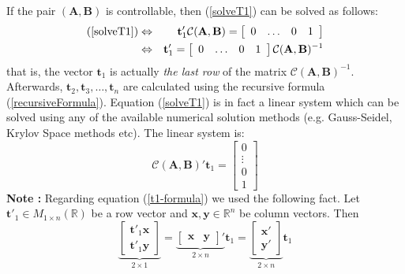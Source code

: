 \documentclass[a4paper,10pt,oneside]{book}
\begin{document}
%
%
%
\noindent If the pair $(\mathbf{A},\mathbf{B})$ is controllable, then (\ref{solveT1}) can be solved as follows:
\begin{eqnarray}\label{t1-formula}
  \text{(\ref{solveT1})}&\Leftrightarrow&\mathbf{t}'_1\mathcal{C}(\mathbf{A},\mathbf{B}) =\left[ {\begin{array}{*{4}c} 0 & \ldots & 0 & 1 \end{array} } \right] \\
&\Leftrightarrow& \mathbf{t}'_1=\left[ {\begin{array}{*{4}c} 0 & \ldots & 0 & 1 \end{array} } \right]\mathcal{C}(\mathbf{A},\mathbf{B})^{-1}
\end{eqnarray}
that is, the vector $\mathbf{t}_1$ is actually \emph{the last row} of the matrix $\mathcal{C}(\mathbf{A},\mathbf{B})^{-1}$. Afterwards, $\mathbf{t}_2,\mathbf{t}_3,\ldots,\mathbf{t}_n$
are calculated using the recursive formula (\ref{recursiveFormula}). Equation (\ref{solveT1}) is in fact 
a linear system which can be solved using any of the available numerical solution methods
(e.g. Gauss-Seidel, Krylov Space methods etc). The linear system is:
\begin{equation}
 \mathcal{C}(\mathbf{A},\mathbf{B})'\mathbf{t}_1=\left[ {\begin{array}{c} 0\\\vdots\\0\\ 1\end{array} } \right]
\end{equation}
\noindent \textbf{Note :} Regarding equation (\ref{t1-formula}) we used the following fact. Let $\mathbf{t}'_1\in M_{1\times n}(\mathbb{R})$ be a row vector and $\mathbf{x},\mathbf{y}\in\mathbb{R}^n$ be column vectors. Then
\begin{equation}
 \underbrace{\left[ {\begin{array}{c} \mathbf{t}'_1\mathbf{x}\\\mathbf{t}'_1\mathbf{y} \end{array} } \right]}_{2\times 1}=
\underbrace{\left[ {\begin{array}{cc} \mathbf{x}&\mathbf{y} \end{array} } \right]'}_{2\times n}\mathbf{t}_1 =
\underbrace{\left[ {\begin{array}{c} \mathbf{x}'\\\mathbf{y}' \end{array} } \right]}_{2\times n}\mathbf{t}_1
\end{equation}
\end{document}
